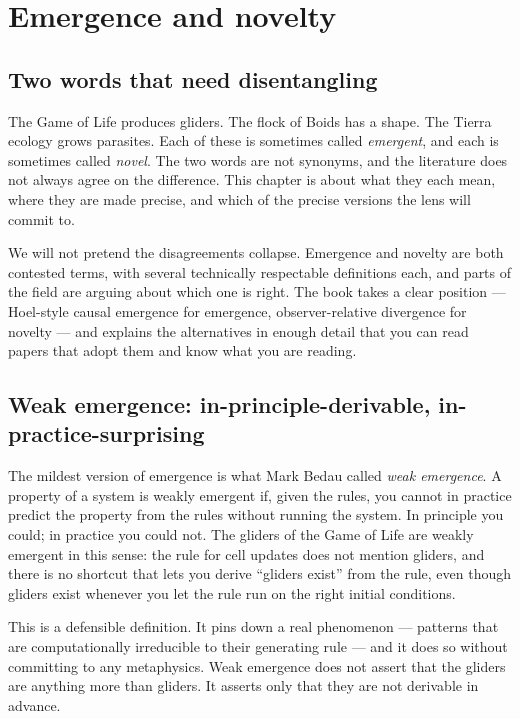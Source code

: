 \chapter{Emergence and novelty}

\section{Two words that need disentangling}

The Game of Life produces gliders. The flock of Boids has a shape. The
Tierra ecology grows parasites. Each of these is sometimes called
\emph{emergent}, and each is sometimes called \emph{novel}. The two words
are not synonyms, and the literature does not always agree on the
difference. This chapter is about what they each mean, where they are
made precise, and which of the precise versions the lens will commit to.

We will not pretend the disagreements collapse. Emergence and novelty are
both contested terms, with several technically respectable definitions
each, and parts of the field are arguing about which one is right. The
book takes a clear position --- Hoel-style causal emergence for emergence,
observer-relative divergence for novelty --- and explains the alternatives
in enough detail that you can read papers that adopt them and know what
you are reading.

\section{Weak emergence: in-principle-derivable, in-practice-surprising}

The mildest version of emergence is what Mark Bedau called \emph{weak
emergence}. A property of a system is weakly emergent if, given the
rules, you cannot in practice predict the property from the rules without
running the system. In principle you could; in practice you could not.
The gliders of the Game of Life are weakly emergent in this sense: the
rule for cell updates does not mention gliders, and there is no shortcut
that lets you derive ``gliders exist'' from the rule, even though
gliders exist whenever you let the rule run on the right initial
conditions.

This is a defensible definition. It pins down a real phenomenon ---
patterns that are computationally irreducible to their generating rule
--- and it does so without committing to any metaphysics. Weak emergence
does not assert that the gliders are anything more than gliders. It
asserts only that they are not derivable in advance.

